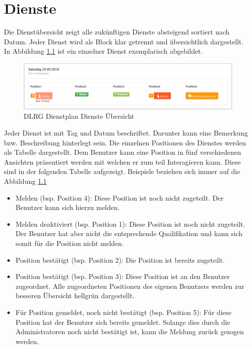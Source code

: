 \chapter{Dienste}
\label{cha:dienste}
Die Dienstübersicht zeigt alle zukünftigen Dienste absteigend sortiert nach Datum. Jeder Dienst wird als Block klar getrennt und übersichtlich dargestellt. In Abbildung \ref{fig:view_service} \textit{} ist ein einzelner Dienst exemplarisch abgebildet.

\begin{figure}[h]
 \begin{addmargin}{-0.2\linewidth}
   \centering 
   \includegraphics[width=20cm]{Bilder/view_service.png}
 \end{addmargin} 
 \caption[Dienste Übersicht]{DLRG Dienstplan Dienste Übersicht}
 \label{fig:view_service}
\end{figure}

\noindent Jeder Dienst ist mit Tag und Datum beschriftet. Darunter kann eine Bemerkung bzw. Beschreibung hinterlegt sein. Die einzelnen Positionen des Dienstes werden als Tabelle dargestellt.
\noindent Dem Benutzer kann eine Position in fünf verschiedenen Ansichten präsentiert werden mit welchen er zum teil Interagieren kann.
Diese sind in der folgenden Tabelle aufgezeigt. Beispiele beziehen sich immer auf die Abbildung \ref{fig:view_service} \textit{}

\begin{itemize}
\item Melden (bsp. Position 4): Diese Position ist noch nicht zugeteilt. Der Benutzer kann sich hierzu melden.
\item Melden deaktiviert (bsp. Position 1): Diese Position ist noch nicht zugeteilt. Der Benutzer hat aber nicht die entsprechende Qualifikation und kann sich somit für die Position nicht melden.
\item Position bestätigt (bsp. Position 2): Die Position ist bereits zugeteilt.
\item Position bestätigt (bsp. Position 3): Diese Position ist an den Benutzer zugeordnet. Alle zugeordneten Positionen des eigenen Benutzers werden zur besseren Übersicht hellgrün dargestellt.
\item Für Position gemeldet, noch nicht bestätigt (bsp. Position 5): Für diese Position hat der Benutzer sich bereits gemeldet. Solange dies durch die Administratoren noch nicht bestätigt ist, kann die Meldung zurück gezogen werden.
\end{itemize}

